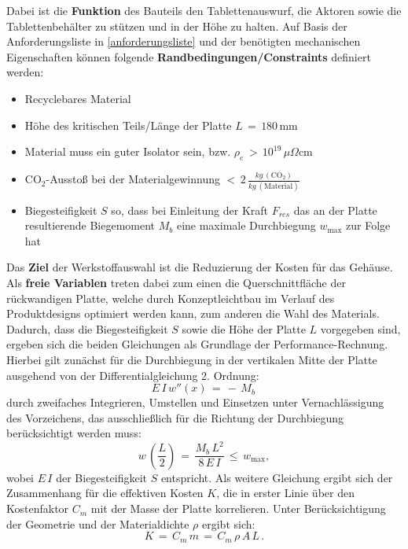 Dabei ist die \textbf{Funktion} des Bauteils den Tablettenauswurf, die Aktoren sowie die Tablettenbehälter zu stützen und in der Höhe zu halten. Auf Basis der Anforderungsliste in \ref{anforderungsliste} und der benötigten mechanischen Eigenschaften können folgende \textbf{Randbedingungen/Constraints} definiert werden:
\begin{itemize}
	\item Recyclebares Material
	\item Höhe des kritischen Teils/Länge der Platte $L\,=\,180\,$mm
	\item Material muss ein guter Isolator sein, bzw. $\rho_e\,>\,10^{19}\,\mu\Omega$cm
	\item CO$_2$-Ausstoß bei der Materialgewinnung $<\,2\,\frac{kg\,(\text{CO}_2)}{kg\,(\text{Material})}$
	\item Biegesteifigkeit $S$ so, dass bei Einleitung der Kraft $F_{res}$ das an der Platte resultierende Biegemoment $M_b$ eine maximale Durchbiegung $w_{\text{max}}$ zur Folge hat
\end{itemize}
Das \textbf{Ziel} der Werkstoffauswahl ist die Reduzierung der Kosten für das Gehäuse. Als \textbf{freie Variablen} treten dabei zum einen die Querschnittfläche der rückwandigen Platte, welche durch Konzeptleichtbau im Verlauf des Produktdesigns optimiert werden kann, zum anderen die Wahl des Materials.
Dadurch, dass die Biegesteifigkeit $S$ sowie die Höhe der Platte $L$ vorgegeben sind, ergeben sich die beiden Gleichungen als Grundlage der Performance-Rechnung. Hierbei gilt zunächst für die Durchbiegung in der vertikalen Mitte der Platte ausgehend von der Differentialgleichung 2. Ordnung:
\begin{equation}
	E\,I\,w''(x)\,=\,-\,M_b\,
\end{equation}
durch zweifaches Integrieren, Umstellen und Einsetzen unter Vernachlässigung des Vorzeichens, das ausschließlich für die Richtung der Durchbiegung berücksichtigt werden muss:
\begin{equation} \label{durchbiegung}
	w\,\left(\frac{L}{2}\right)\,=\,\frac{M_b \,L^2}{8\,E\,I}\,\le\,w_{\text{max}},
\end{equation}
wobei $E\,I$ der Biegesteifigkeit $S$ entspricht. Als weitere Gleichung ergibt sich der Zusammenhang für die effektiven Kosten $K$, die in erster Linie über den Kostenfaktor $C_m$ mit der Masse der Platte korrelieren. Unter Berücksichtigung der Geometrie und der Materialdichte $\rho$ ergibt sich:
\begin{equation} \label{kosten}
	K\,=\,C_m\,m\,=\,C_m\,\rho\,A\,L\,.
\end{equation}
